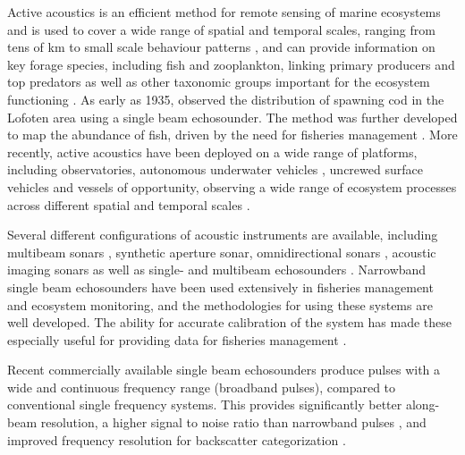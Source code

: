 \documentclass[preprint,12pt,TurnOnLineNumbers]{JASAnew}
\begin{document}
Active acoustics is an efficient method for remote sensing of marine ecosystems and is used to cover a wide range of spatial and temporal scales, ranging from tens of km \citep{makris_fish_2006} to small scale behaviour patterns \citep{klevjer_split-beam_2003}, and can provide information on key forage species, including fish and zooplankton, linking primary producers and top predators as well as other taxonomic groups important for the ecosystem functioning \citep{benoit-bird_ecological_2016}. As early as 1935, \citet{sund_echo_1935} observed the distribution of spawning cod in the Lofoten area using a single beam echosounder. The method was further developed to map the abundance of fish, driven by the need for fisheries management \citep{Simmonds2005Fisheries}. More recently, active acoustics have been deployed on a wide range of platforms, including observatories, autonomous underwater vehicles \citep{fernandes_autonomous_2003}, uncrewed surface vehicles \citep{de_robertis_uncrewed_2021} and vessels of opportunity, observing a wide range of ecosystem processes across different spatial and temporal scales \citep{godo_marine_2014}.

Several different configurations of acoustic instruments are available, including multibeam sonars \citep{gerlotto_two_1999}, synthetic aperture sonar, omnidirectional sonars \citep{misund_improved_1996}, acoustic imaging sonars \citep{jaffe_ftv_1995} as well as single- and multibeam echosounders \citep{trenkel_new_2008}. Narrowband single beam echosounders have been used extensively in fisheries management and ecosystem monitoring, and the methodologies for using these systems are well developed. The ability for accurate calibration of the system has made these especially useful for providing data for fisheries management \citep{Simmonds2005Fisheries}.

Recent commercially available single beam echosounders produce pulses with a wide and continuous frequency range (broadband pulses), compared to conventional single frequency systems. This provides significantly better along-beam resolution, a higher signal to noise ratio than narrowband pulses \citep{Chu1998Application, ehrenbergFMSlideChirp2000}, and improved frequency resolution for backscatter categorization \citep{korneliussen2018}.
\end{document}
